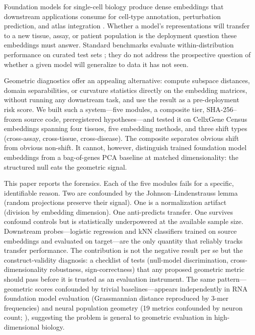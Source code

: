 \documentclass[9pt,lineno]{elife}
\begin{document}
Foundation models for single-cell biology produce dense embeddings that downstream applications consume for cell-type annotation, perturbation prediction, and atlas integration \citep{theodoris2023geneformer, cui2024scgpt, rosen2026uce}. Whether a model's representations will transfer to a new tissue, assay, or patient population is the deployment question these embeddings must answer. Standard benchmarks evaluate within-distribution performance on curated test sets \citep{luecken2022scib, wu2025scfm}; they do not address the prospective question of whether a given model will generalize to data it has not seen.

Geometric diagnostics offer an appealing alternative: compute subspace distances, domain separabilities, or curvature statistics directly on the embedding matrices, without running any downstream task, and use the result as a pre-deployment risk score. We built such a system---five modules, a composite tier, SHA-256--frozen source code, preregistered hypotheses---and tested it on CellxGene Census embeddings spanning four tissues, five embedding methods, and three shift types (cross-assay, cross-tissue, cross-disease). The composite separates obvious shift from obvious non-shift. It cannot, however, distinguish trained foundation model embeddings from a bag-of-genes PCA baseline at matched dimensionality: the structured null eats the geometric signal.

This paper reports the forensics. Each of the five modules fails for a specific, identifiable reason. Two are confounded by the Johnson--Lindenstrauss lemma (random projections preserve their signal). One is a normalization artifact (division by embedding dimension). One anti-predicts transfer. One survives confound controls but is statistically underpowered at the available sample size. Downstream probes---logistic regression and kNN classifiers trained on source embeddings and evaluated on target---are the only quantity that reliably tracks transfer performance. The contribution is not the negative result per se but the construct-validity diagnosis: a checklist of tests (null-model discrimination, cross-dimensionality robustness, sign-correctness) that any proposed geometric metric should pass before it is trusted as an evaluation instrument. The same pattern---geometric scores confounded by trivial baselines---appears independently in RNA foundation model evaluation (Grassmannian distance reproduced by 3-mer frequencies) and neural population geometry (19 metrics confounded by neuron count; \citealp{tower2026bracket}), suggesting the problem is general to geometric evaluation in high-dimensional biology.
\end{document}
